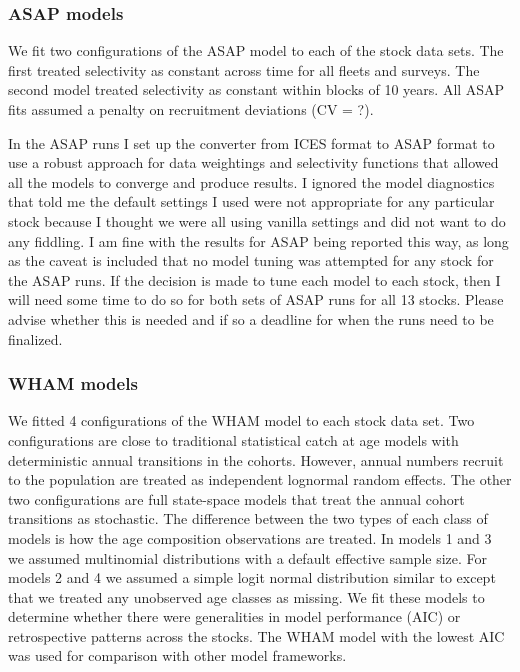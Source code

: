 \documentclass[12pt,letterpaper, leqno]{article}
\begin{document}
\subsubsection*{ASAP models}

We fit two configurations of the ASAP model to each of the stock data sets. The first treated selectivity as constant across time for all fleets and surveys. The second model treated selectivity as constant within blocks of 10 years. All ASAP fits assumed a penalty on recruitment deviations (CV = ?).

In the ASAP runs I set up the converter from ICES format to ASAP format to use a robust approach for data weightings and selectivity functions that allowed all the models to converge and produce results. I ignored the model diagnostics that told me the default settings I used were not appropriate for any particular stock because I thought we were all using vanilla settings and did not want to do any fiddling. I am fine with the results for ASAP being reported this way, as long as the caveat is included that no model tuning was attempted for any stock for the ASAP runs. If the decision is made to tune each model to each stock, then I will need some time to do so for both sets of ASAP runs for all 13 stocks. Please advise whether this is needed and if so a deadline for when the runs need to be finalized.

\subsubsection*{WHAM models}

We fitted 4 configurations of the WHAM model to each stock data set. Two configurations are close to traditional statistical catch at age models with deterministic annual transitions in the cohorts. However, annual numbers recruit to the population are treated as independent lognormal random effects. The other two configurations are full state-space models that treat the annual cohort transitions as stochastic. The difference between the two types of each class of models is how the age composition observations are treated. In models 1 and 3 we assumed multinomial distributions with a default effective sample size. For models 2 and 4 we assumed a simple logit normal distribution similar to \citet{milleretal16} except that we treated any unobserved age classes as missing. We fit these models to determine whether there were generalities in model performance (AIC) or retrospective patterns across the stocks. The WHAM model with the lowest AIC was used for comparison with other model frameworks.
\end{document}
